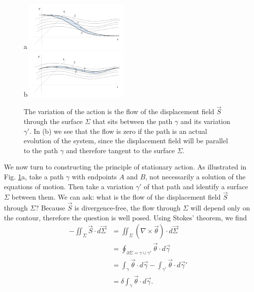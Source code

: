 \documentclass[fleqn,10pt]{wlscirep}
\begin{document}
\begin{figure}
	a \includegraphics[width = 0.45\textwidth]{ActionNonOptimized.png} \\
	b \includegraphics[width = 0.45\textwidth]{ActionOptimized.png}
	\caption{\footnotesize{The variation of the action is the flow of the displacement field $\vec{S}$ through the surface $\Sigma$ that sits between the path $\gamma$ and its variation $\gamma'$. In (b) we see that the flow is zero if the path is an actual evolution of the system, since the displacement field will be parallel to the path $\gamma$ and therefore tangent to the surface $\Sigma$.}}\label{fig_action}
\end{figure}

We now turn to constructing the principle of stationary action. As illustrated in Fig. \ref{fig_action}a, take a path $\gamma$ with endpoints $A$ and $B$, not necessarily a solution of the equations of motion. Then take a variation $\gamma'$ of that path and identify a surface $\Sigma$ between them. We can ask: what is the flow of the displacement field $\vec{S}$ through $\Sigma$? Because $\vec{S}$ is divergence-free, the flow through $\Sigma$ will depend only on the contour, therefore the question is well posed. Using Stokes' theorem, we find
\begin{equation}\label{sdof_action}
\begin{aligned}
	- \iint_{\Sigma} \vec{S} \cdot d\vec{\Sigma} &= \iint_{\Sigma} \left( \nabla \times \vec{\theta} \right) \cdot d\vec{\Sigma} \\
	&=  \oint_{\partial \Sigma = \gamma \cup \gamma'} \vec{\theta}  \cdot d\vec{\gamma}  \\
&= \int_{\gamma} \vec{\theta} \cdot d\vec{\gamma} - \int_{\gamma'} \vec{\theta} \cdot d\vec{\gamma}' \\
	&= \delta \int_{\gamma} \vec{\theta} \cdot d\vec{\gamma}.
\end{aligned}
\end{equation}
\end{document}
